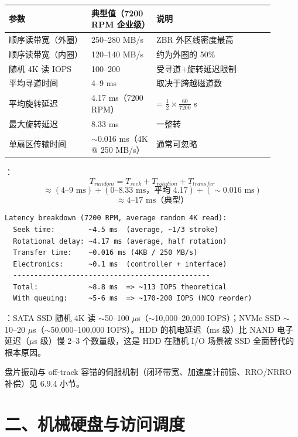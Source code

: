 \begin{longtable}{L{0.28\linewidth}L{0.22\linewidth}L{0.4\linewidth}}
\toprule
参数 & 典型值（7200 RPM 企业级） & 说明 \\
\midrule
顺序读带宽（外圈） & 250--280 MB/s & ZBR 外区线密度最高 \\\tablerowrule
顺序读带宽（内圈） & 120--140 MB/s & 约为外圈的 50\% \\\tablerowrule
随机 4K 读 IOPS & 100--200 & 受寻道+旋转延迟限制 \\\tablerowrule
平均寻道时间 & 4--9 ms & 取决于跨越磁道数 \\\tablerowrule
平均旋转延迟 & 4.17 ms（7200 RPM） & = $\frac{1}{2} \times \frac{60}{7200}$ s \\\tablerowrule
最大旋转延迟 & 8.33 ms & 一整转 \\\tablerowrule
单扇区传输时间 & $\sim$0.016 ms（4K @ 250 MB/s） & 通常可忽略 \\
\bottomrule
\end{longtable}

：
\[
T_{random} = T_{seek} + T_{rotation} + T_{transfer}
\]
\[
\approx (4\text{--}9 \text{ ms}) + (0\text{--}8.33 \text{ ms，平均 4.17}) + (\sim0.016 \text{ ms})
\]
\[
\approx 4\text{--}17 \text{ ms（典型）}
\]

\begin{lstlisting}
Latency breakdown (7200 RPM, average random 4K read):
  Seek time:        ~4.5 ms  (average, ~1/3 stroke)
  Rotational delay: ~4.17 ms (average, half rotation)
  Transfer time:    ~0.016 ms (4KB / 250 MB/s)
  Electronics:      ~0.1 ms  (controller + interface)
  -----------------------------------------------
  Total:            ~8.8 ms  => ~113 IOPS theoretical
  With queuing:     ~5-6 ms  => ~170-200 IOPS (NCQ reorder)
\end{lstlisting}

：SATA SSD 随机 4K 读 $\sim$50--100 $\mu$s（$\sim$10,000--20,000 IOPS）；NVMe SSD $\sim$10--20 $\mu$s（$\sim$50,000--100,000 IOPS）。HDD 的机电延迟（ms 级）比 NAND 电子延迟（$\mu$s 级）慢 2--3 个数量级，这是 HDD 在随机 I/O 场景被 SSD 全面替代的根本原因。

盘片振动与 off-track 容错的伺服机制（闭环带宽、加速度计前馈、RRO/NRRO 补偿）见 6.9.4 小节。

\section{二、机械硬盘与访问调度}

